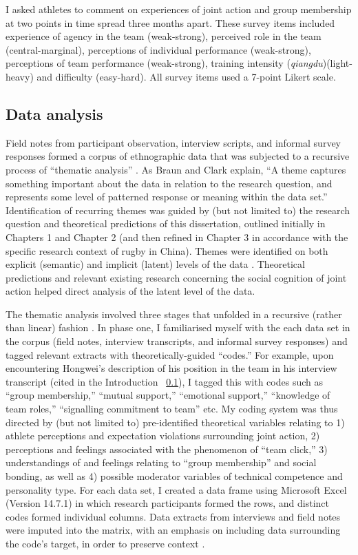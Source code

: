   I asked athletes to comment on experiences of joint action and group membership at two points in time spread three months apart.  These survey items included experience of agency in the team (weak-strong), perceived role in the team (central-marginal), perceptions of individual performance (weak-strong), perceptions of team performance (weak-strong), training intensity (\textit{qiangdu})(light-heavy) and difficulty (easy-hard).  All survey items used a 7-point Likert scale.


\subsection{Data analysis}
Field notes from participant observation, interview scripts, and informal survey responses formed a corpus of ethnographic data that was subjected to a recursive process of ``thematic analysis'' \citep{Braun2006}.  As Braun and Clark \textcite[10]{Braun2006} explain, ``A theme captures something important about the data in relation to the research question, and represents some level of patterned response or meaning within the data set.'' Identification of recurring themes was guided by (but not limited to) the research question and theoretical predictions of this dissertation, outlined initially in Chapters 1 and Chapter 2 (and then refined in Chapter 3 in accordance with the specific research context of rugby in China).  Themes were identified on both explicit (semantic) and implicit (latent) levels of the data \citep{Boyatzis1998}. Theoretical predictions and relevant existing research concerning the social cognition of joint action helped direct analysis of the latent level of the data.

The thematic analysis involved three stages that unfolded in a recursive (rather than linear) fashion \citep{Braun2006}. In phase one, I familiarised myself with the each data set in the corpus (field notes, interview transcripts, and informal survey responses) and tagged relevant extracts with theoretically-guided ``codes.'' For example, upon encountering Hongwei's description of his position in the team in his interview transcript (cited in the Introduction ~\ref{}), I tagged this with codes such as ``group membership,'' ``mutual support,'' ``emotional support,'' ``knowledge of team roles,'' ``signalling commitment to team'' etc.  My coding system was thus directed by (but not limited to) pre-identified theoretical variables relating to 1) athlete perceptions and expectation violations surrounding joint action, 2) perceptions and feelings associated with the phenomenon of ``team click,'' 3) understandings of and feelings relating to ``group membership'' and social bonding, as well as 4) possible moderator variables of technical competence and personality type.  For each data set, I created a data frame using Microsoft Excel (Version 14.7.1) in which research participants formed the rows, and distinct codes formed individual columns. Data extracts from interviews and field notes were imputed into the matrix, with an emphasis on including data surrounding the code's target, in order to preserve context \citep[see][]{Bryman2001}.


